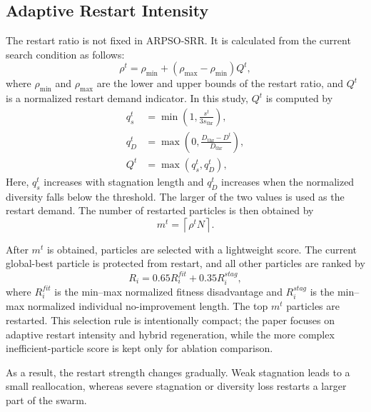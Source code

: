 \documentclass[conference]{IEEEtran}
\begin{document}
\subsection{Adaptive Restart Intensity}
The restart ratio is not fixed in ARPSO-SRR. It is calculated from the current search condition as follows:
\begin{equation}
    \rho^t=\rho_{\min}+(\rho_{\max}-\rho_{\min})Q^t,
    \label{eq:restart_ratio}
\end{equation}
where $\rho_{\min}$ and $\rho_{\max}$ are the lower and upper bounds of the restart ratio, and $Q^t$ is a normalized restart demand indicator. In this study, $Q^t$ is computed by
\begin{equation}
    \begin{aligned}
        q_s^t & = \min\left(1,\frac{s^t}{3s_{\mathrm{thr}}}\right),                 \\
        q_D^t & = \max\left(0,\frac{D_{\mathrm{thr}}-D^t}{D_{\mathrm{thr}}}\right), \\
        Q^t   & = \max(q_s^t,q_D^t),
    \end{aligned}
    \label{eq:restart_demand}
\end{equation}
Here, $q_s^t$ increases with stagnation length and $q_D^t$ increases when the normalized diversity falls below the threshold. The larger of the two values is used as the restart demand. The number of restarted particles is then obtained by
\begin{equation}
    m^t=\left\lceil \rho^t N \right\rceil .
    \label{eq:restart_number}
\end{equation}

After $m^t$ is obtained, particles are selected with a lightweight score. The current global-best particle is protected from restart, and all other particles are ranked by
\begin{equation}
    R_i=0.65R_i^{fit}+0.35R_i^{stag},
    \label{eq:srr_selection}
\end{equation}
where $R_i^{fit}$ is the min--max normalized fitness disadvantage and $R_i^{stag}$ is the min--max normalized individual no-improvement length. The top $m^t$ particles are restarted. This selection rule is intentionally compact; the paper focuses on adaptive restart intensity and hybrid regeneration, while the more complex inefficient-particle score is kept only for ablation comparison.

As a result, the restart strength changes gradually. Weak stagnation leads to a small reallocation, whereas severe stagnation or diversity loss restarts a larger part of the swarm.
\end{document}
